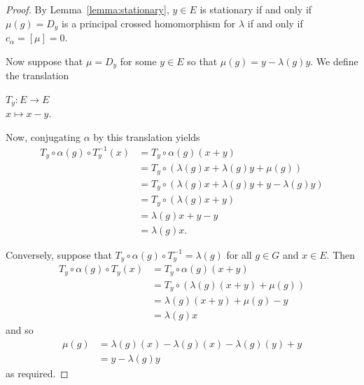 \begin{proof}
    By Lemma~\ref{lemma:stationary}, $y \in E$ is stationary if and only if
    $\mu(g) = D_y$ is a principal crossed homomorphism for $\lambda$ if and only
    if $c_{\alpha} = [\mu] =0$.

    Now suppose that $\mu =D_y$ for some $y \in E$ so that $\mu(g) = y -
        \lambda(g)y$. We define the translation
    \begin{center}
        $T_y : E \to E$\\
        $ x \mapsto x-y.$
    \end{center}
    Now, conjugating $\alpha$ by this translation yields
    \begin{align*}
        T_y \circ \alpha(g) \circ T_y^{-1}(x) & = T_y\circ \alpha(g)(x+y)                                \\
                                              & = T_y\circ(\lambda(g)x  + \lambda(g)y + \mu(g))          \\
                                              & = T_y \circ (\lambda(g)x + \lambda(g)y +y - \lambda(g)y) \\
                                              & = T_y \circ (\lambda(g)x +y )                            \\
                                              & = \lambda(g)x +y-y                                       \\
                                              & = \lambda(g)x.
    \end{align*}

    Conversely, suppose that $T_y \circ \alpha(g) \circ T_y^{-1} = \lambda(g)$ for
    all $g \in G$ and $x \in E$. Then
    \begin{align*}
        T_y \circ \alpha(g) \circ T_y(x) & = T_y \circ \alpha(g)(x+y)             \\
                                         & = T_y \circ (\lambda(g)(x+y) + \mu(g)) \\
                                         & = \lambda(g)(x+y)+\mu(g)-y             \\
                                         & = \lambda(g)x
    \end{align*}
    and so
    \begin{align*}
        \mu(g) & = \lambda(g)(x) - \lambda(g)(x) - \lambda(g)(y) +y \\
               & = y - \lambda(g)y
    \end{align*}
    as required.
\end{proof}

